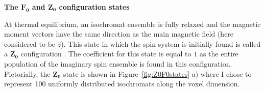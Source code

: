 

% 

\hfill

\textbf{The $\bm{F_0}$ and $\bm{Z_0}$ configuration states}

At thermal equilibrium, an isochromat ensemble is fully relaxed and the magnetic moment vectors have the same direction as the main magnetic field (here considered to be $\hat{z}$).
This state in which the spin system is initially found is called a $\bm{Z_0}$ configuration \cite{Weigel2015} \cite{Scheffler1999} \cite{Hennig1991}.
The coefficient for this state is equal to $1$ as the entire population of the imaginary spin ensemble is found in this configuration.
Pictorially, the $\bm{Z_0}$ state is shown in Figure~\ref{fig:Z0F0states} a) where I chose to represent 100 uniformly distributed isochromats along the voxel dimension.

